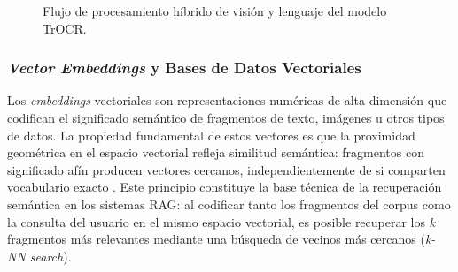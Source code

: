 \begin{figure}[H]
    \centering
    \caption{Flujo de procesamiento híbrido de visión y lenguaje del modelo TrOCR.}
    \label{fig:trocr_flow_diagram}
\end{figure}

\subsubsection{\textit{Vector Embeddings} y Bases de Datos Vectoriales}

Los \textit{embeddings} vectoriales son representaciones numéricas de alta dimensión que 
codifican el significado semántico de fragmentos de texto, imágenes u otros tipos de 
datos. La propiedad fundamental de estos vectores es que la proximidad geométrica en 
el espacio vectorial refleja similitud semántica: fragmentos con significado afín 
producen vectores cercanos, independientemente de si comparten vocabulario exacto 
\parencite{GaoRAGSurvey2024}. Este principio constituye la base técnica de la 
recuperación semántica en los sistemas RAG: al codificar tanto los fragmentos del 
corpus como la consulta del usuario en el mismo espacio vectorial, es posible recuperar 
los $k$ fragmentos más relevantes mediante una búsqueda de vecinos más cercanos 
(\textit{k-NN search}).

